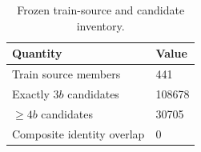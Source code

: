 \begin{table}[tb]
  \centering
  \footnotesize
  \caption{Frozen train-source and candidate inventory.}
  \label{tab:train-inventory}
  \begin{tabular}{ll}
    \toprule
    Quantity & Value \\
    \midrule
    Train source members & 441 \\
    Exactly $3b$ candidates & 108678 \\
    $\geq4b$ candidates & 30705 \\
    Composite identity overlap & 0 \\
    \bottomrule
  \end{tabular}
\end{table}
